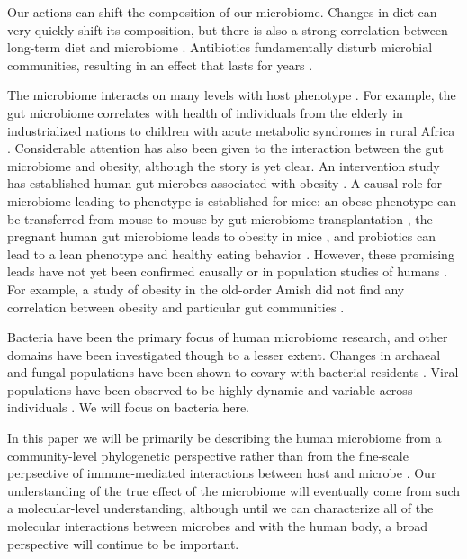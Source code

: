 \documentclass{amsart}
\begin{document}
Our actions can shift the composition of our microbiome.
Changes in diet can very quickly shift its composition, but there is also a strong correlation between long-term diet and microbiome \citep{li2009human,wu2011linking}.
Antibiotics fundamentally disturb microbial communities, resulting in an effect that lasts for years \citep{jernberg2007long,dethlefsen2008pervasive,jakobsson2010short,dethlefsen2011incomplete}.

The microbiome interacts on many levels with host phenotype \citep[reviewed in][]{cho2012human}.
For example, the gut microbiome correlates with health of individuals from the elderly in industrialized nations \citep{claesson2012gut} to children with acute metabolic syndromes in rural Africa \citep{smith2013gut}.
Considerable attention has also been given to the interaction between the gut microbiome and obesity, although the story is yet clear.
An intervention study has established human gut microbes associated with obesity \citep{ley2006microbial}.
A causal role for microbiome leading to phenotype is established for mice: an obese phenotype can be transferred from mouse to mouse by gut microbiome transplantation \citep{turnbaugh2006obesity}, the pregnant human gut microbiome leads to obesity in mice \citep{koren2012host}, and probiotics can lead to a lean phenotype and healthy eating behavior \citep{poutahidis2013microbial}.
However, these promising leads have not yet been confirmed causally or in population studies of humans \citep{zhao2013gut}.
For example, a study of obesity in the old-order Amish did not find any correlation between obesity and particular gut communities \citep{zupancic2012analysis}.

Bacteria have been the primary focus of human microbiome research, and other domains have been investigated though to a lesser extent.
Changes in archaeal and fungal populations have been shown to covary with bacterial residents \citep{hoffmann2013archaea}.
Viral populations have been observed to be highly dynamic and variable across individuals \citep{reyes2010viruses,minot2011human,minot2013rapid}.
We will focus on bacteria here.

In this paper we will be primarily be describing the human microbiome from a community-level phylogenetic perspective rather than from the fine-scale perpsective of immune-mediated interactions between host and microbe \citep[reviewed in][]{hooper2012interactions}.
Our understanding of the true effect of the microbiome will eventually come from such a molecular-level understanding, although until we can characterize all of the molecular interactions between microbes and with the human body, a broad perspective will continue to be important.
\end{document}
